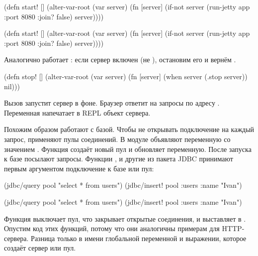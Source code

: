 \ifnarrow

\begin{clojure}
(defn start! []
  (alter-var-root
   (var server)
   (fn [server]
     (if-not server
       (run-jetty app {:port 8080
                       :join? false})
       server))))
\end{clojure}

\else

\begin{clojure}
(defn start! []
  (alter-var-root (var server)
    (fn [server]
      (if-not server
        (run-jetty app {:port 8080 :join? false})
        server))))
\end{clojure}

\fi

\noindent
Аналогично работает : если сервер включен (не ),
остановим его и вернём .

\begin{clojure}
(defn stop! []
  (alter-var-root
    (var server)
    (fn [server]
      (when server
        (.stop server))
      nil)))
\end{clojure}

Вызов  запустит сервер в фоне. Браузер ответит на запросы по
адресу . Переменная  напечатает в REPL
объект сервера.


Похожим образом работают с базой. Чтобы не открывать подключение на каждый
запрос, применяют пулы соединений. В модуле объявляют переменную  со
значением . Функция  создаёт новый пул и обновляет
переменную. После запуска к базе посылают запросы. Функции ,
 и другие из пакета JDBC принимают первым аргументом подключение к
базе или пул:

\ifnarrow

\begin{clojure}
(jdbc/query pool "select * from users")
(jdbc/insert! pool
  :users {:name "Ivan"})
\end{clojure}

\else

\begin{clojure}
(jdbc/query pool "select * from users")
(jdbc/insert! pool :users {:name "Ivan"})
\end{clojure}

\fi

Функция  выключает пул, что закрывает открытые соединения, и
выставляет  в . Опустим код этих функций, потому что они
аналогичны примерам для HTTP-сервера. Разница только в имени глобальной
переменной и выражении, которое создаёт сервер или пул.

